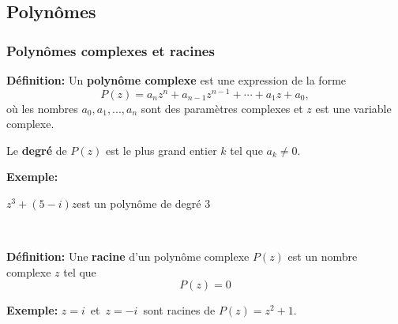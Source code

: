 
\subsection{Polyn\^omes} 

\begin{frame}
\frametitle{\bf Polyn\^omes complexes et racines}
\medskip 

{\bf D\'efinition:} 
Un {\bf polyn\^ome complexe} est une expression de la forme 
$$P(z)=a_n z^n + a_{n-1}z^{n-1} +\cdots+ a_1 z + a_0,$$ 
où les nombres $a_0, a_1,...,a_n$ sont des paramètres complexes et $z$ est une variable complexe. 
\vspace*{1mm} 

Le {\bf degr\'e} de $P(z)$ est le plus grand entier $k$ tel que 
$a_k\neq 0$. 
\vspace*{2mm} 

{\small
{\bf Exemple:}
\quad
\parbox[t]{7cm}{
$z^3+(5-i)z$\quad est un polyn\^ome de degr\'e $3$ 
}}

\

{\bf D\'efinition:} 
Une {\bf racine} d'un polyn\^ome complexe $P(z)$ est un nombre 
complexe $z$ tel que $$P(z)=0$$ 
\vspace*{1mm} 

{\small
{\bf Exemple:} 
\quad $z=i$\ et\ $z=-i$\ sont racines de $P(z)=z^2\!+\!1$.
}

\end{frame}


